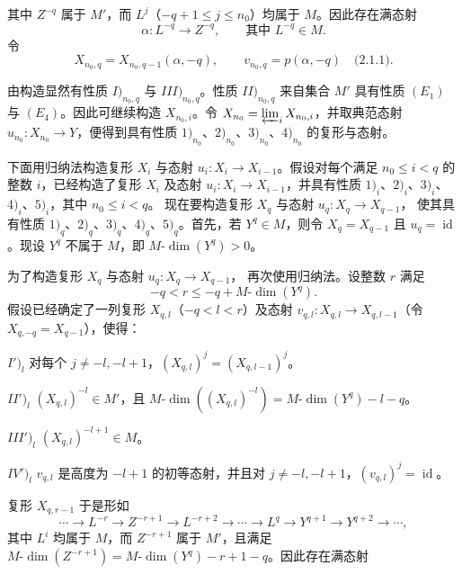 \clearpage
{}%
\begingroup\small\setlength{\parskip}{0pt}\setlength{\emergencystretch}{1.5em}
\setlength{\abovedisplayskip}{4pt plus 2pt minus 2pt}%
\setlength{\belowdisplayskip}{4pt plus 2pt minus 2pt}%

其中 $Z^{-q}$ 属于 $M'$，而 $L^j$（$-q+1\leq j\leq n_0$）均属于
$M$。因此存在满态射
\[
\alpha\colon L^{-q}\longrightarrow Z^{-q},
\qquad\text{其中 }L^{-q}\in M.
\]
令
\[
X_{n_0,q}=X_{n_0,q-1}(\alpha,-q),
\qquad
v_{n_0,q}=p(\alpha,-q)\quad\text{(2.1.1)}.
\]

由构造显然有性质 $I)_{n_0,q}$ 与 $III)_{n_0,q}$。性质
$II)_{n_0,q}$ 来自集合 $M'$ 具有性质 $(E_1)$ 与 $(E_4)$。因此可继续构造
$X_{n_0,i}$。令 $X_{n_0}=\varprojlim_i X_{n_0,i}$，并取典范态射
$u_{n_0}\colon X_{n_0}\longrightarrow Y$，便得到具有性质
$1)_{n_0}$、$2)_{n_0}$、$3)_{n_0}$、$4)_{n_0}$ 的复形与态射。

下面用归纳法构造复形 $X_i$ 与态射
$u_i\colon X_i\longrightarrow X_{i-1}$。假设对每个满足 $n_0\leq i<q$
的整数 $i$，已经构造了复形 $X_i$ 及态射
$u_i\colon X_i\longrightarrow X_{i-1}$，并具有性质
$1)_i$、$2)_i$、$3)_i$、$4)_i$、$5)_i$，其中 $n_0\leq i<q$。
现在要构造复形 $X_q$ 与态射 $u_q\colon X_q\longrightarrow X_{q-1}$，
使其具有性质 $1)_q$、$2)_q$、$3)_q$、$4)_q$、$5)_q$。首先，若
$Y^q\in M$，则令 $X_q=X_{q-1}$ 且 $u_q=\operatorname{id}$。现设
$Y^q$ 不属于 $M$，即 $M\text{-}\dim(Y^q)>0$。

为了构造复形 $X_q$ 与态射 $u_q\colon X_q\longrightarrow X_{q-1}$，
再次使用归纳法。设整数 $r$ 满足
\[
-q<r\leq -q+M\text{-}\dim(Y^q).
\]
假设已经确定了一列复形 $X_{q,l}$（$-q<l<r$）及态射
$v_{q,l}\colon X_{q,l}\longrightarrow X_{q,l-1}$（令
$X_{q,-q}=X_{q-1}$），使得：

\noindent$I')_l$
对每个 $j\neq-l,-l+1$，$(X_{q,l})^j=(X_{q,l-1})^j$。

\noindent$II')_l$
$(X_{q,l})^{-l}\in M'$，且
$M\text{-}\dim((X_{q,l})^{-l})=M\text{-}\dim(Y^q)-l-q$。

\noindent$III')_l$
$(X_{q,l})^{-l+1}\in M$。

\noindent$IV')_l$
$v_{q,l}$ 是高度为 $-l+1$ 的初等态射，并且对
$j\neq-l,-l+1$，$(v_{q,l})^j=\operatorname{id}$。

复形 $X_{q,r-1}$ 于是形如
\[
\cdots\longrightarrow L^{-r}\longrightarrow Z^{-r+1}
\longrightarrow L^{-r+2}\longrightarrow\cdots\longrightarrow L^q
\longrightarrow Y^{q+1}\longrightarrow Y^{q+2}\longrightarrow\cdots,
\]
其中 $L^i$ 均属于 $M$，而 $Z^{-r+1}$ 属于 $M'$，且满足
$M\text{-}\dim(Z^{-r+1})=M\text{-}\dim(Y^q)-r+1-q$。因此存在满态射
\endgroup
